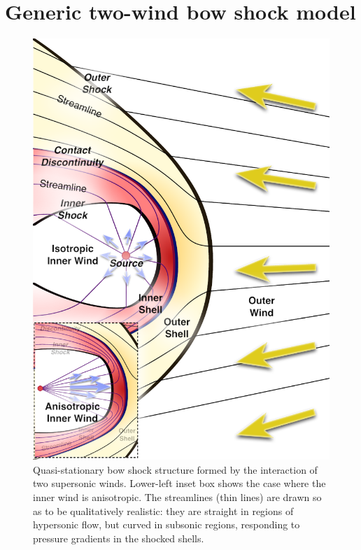 \section{Generic two-wind bow shock model}
\label{sec:generic-model}

\begin{figure}
  \includegraphics[width=\linewidth]{figs/generic-bowshock}
  \caption{Quasi-stationary bow shock structure formed by the
    interaction of two supersonic winds.  Lower-left inset box shows
    the case where the inner wind is anisotropic. The streamlines
    (thin lines) are drawn so as to be qualitatively realistic: they
    are straight in regions of hypersonic flow, but curved in subsonic
    regions, responding to pressure gradients in the shocked shells.}
\label{fig:2-winds}
\end{figure}

